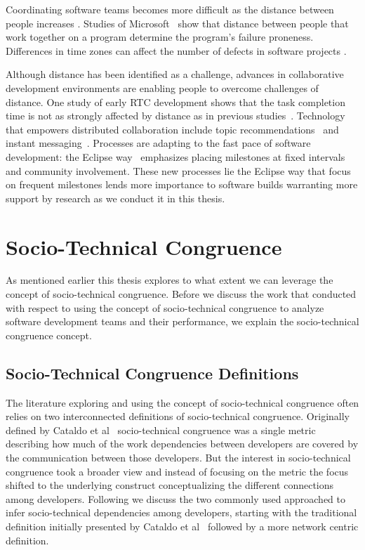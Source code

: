 Coordinating software teams becomes more difficult as the distance between people increases \cite{herbsleb:icse:2001}.
Studies of Microsoft~\cite{bird2009:dds_quality,nagappan:icse:2008}
show that distance between people that work together on a
program determine the program's failure proneness.
Differences in time zones can affect the number of defects in software projects \cite{cataldo2009:quality}.

Although distance has been identified as a challenge, advances in collaborative
development environments are enabling people to overcome challenges of distance.
One study of early RTC development
shows that the task completion time is not as strongly affected by distance as in previous studies~\cite{Nguyen:2008Distance}. Technology that empowers distributed collaboration include topic recommendations~\cite{carter2004} and instant messaging~\cite{niinimaki2008}. Processes are adapting to the fast pace of software development: the Eclipse way~\cite{frost:ieeesoftware:2007} emphasizes placing milestones at fixed intervals and community involvement.
These new processes lie the Eclipse way that focus on frequent milestones lends more importance to software builds warranting more support by research as we conduct it in this thesis.




\section{Socio-Technical Congruence}
As mentioned earlier this thesis explores to what extent we can leverage the concept of socio-technical congruence. 
Before we discuss the work that conducted with respect to using the concept of socio-technical congruence to analyze software development teams and their performance, we explain the socio-technical congruence concept.

\subsection{Socio-Technical Congruence Definitions}
The literature exploring and using the concept of socio-technical congruence often relies on two interconnected definitions of socio-technical congruence.
Originally defined by Cataldo et al~\cite{cataldo:cscw:2006} socio-technical congruence was a single metric describing how much of the work dependencies between developers are covered by the communication between those developers.
But the interest in socio-technical congruence took a broader view and instead of focusing on the metric the focus shifted to the underlying construct conceptualizing the different connections among developers.
Following we discuss the two commonly used approached to infer socio-technical dependencies among developers, starting with the traditional definition initially presented by Cataldo et al~\cite{cataldo:cscw:2006} followed by a more network centric definition.

